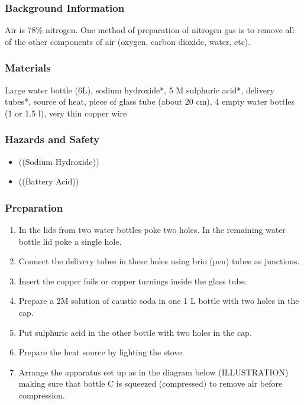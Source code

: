 \subsubsection*{Background Information}
Air is 78\% nitrogen. One method of preparation of nitrogen gas is to remove all of the other components of air (oxygen, carbon dioxide, water, etc).

\subsubsection*{Materials}
Large water bottle (6L), sodium hydroxide*, 5 M sulphuric acid*, delivery tubes*, source of heat, piece of glass tube (about 20 cm), 4 empty water bottles (1 or 1.5 l), very thin copper wire

\subsubsection*{Hazards and Safety}
\begin{itemize}
\item{((Sodium Hydroxide))}
\item{((Battery Acid))}
\end{itemize}

\subsubsection*{Preparation}
\begin{enumerate}
\item{In the lids from two water bottles poke two holes. In the remaining water bottle lid poke a single hole.}
\item{Connect the delivery tubes in these holes using brio (pen) tubes as junctions.}
\item{Insert the copper foils or copper turnings inside the glass tube.}
\item{Prepare a 2M solution of caustic soda in one 1 L bottle with two holes in the cap.}
\item{Put sulphuric acid in the other bottle with two holes in the cap.}
\item{Prepare the heat source by lighting the stove.}
\item{Arrange the apparatus set up as in the diagram below (ILLUSTRATION) making sure that bottle C is squeezed (compressed) to remove air before compression.}
\end{enumerate}

